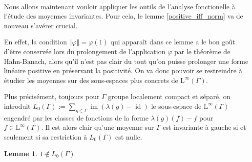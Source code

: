 \documentclass[a4paper,12pt]{article}
\newtheorem{lemma}[theorem]{Lemme}
\newcommand{\norm}[1]{\left\Vert #1\right\Vert}
\newcommand{\ssi}{si et seulement si }
\DeclareMathOperator{\id}{id}
\DeclareMathOperator{\Ima}{im}
\begin{document}
\paragraph{}
Nous allons maintenant vouloir appliquer les outils de l'analyse fonctionelle à l'étude des moyennes invariantes.
Pour cela, le lemme \ref{positive_iff_norm} va de nouveau s'avérer crucial.

En effet, la condition $\norm\varphi = \varphi(1)$ qui apparaît dans ce lemme a le bon goût d'être conservée lors du prolongement de l'application 
$\varphi$ par le théorème de Hahn-Banach, alors qu'il n'est pas clair du tout qu'on puisse prolonger une forme linéaire positive en préservant 
la positivité. On va donc pouvoir se restreindre à étudier les moyennes sur des sous-espaces plus concrets de $\mathrm{L}^\infty(\Gamma)$.

Plus précisément, toujours pour $\Gamma$ groupe localement compact et séparé, on introduit $L_0(\Gamma) := \sum_{g\in\Gamma} \Ima(\lambda(g) - \id)$ le sous-espace de 
$\mathrm{L}^\infty(\Gamma)$ engendré par les classes de fonctions de la forme $\lambda(g)(f) - f$ pour $f\in \mathrm{L}^\infty(\Gamma)$. 
Il est alors clair qu'une moyenne sur $\Gamma$ est invariante à gauche \ssi sa restriction à $L_0(\Gamma)$ est nulle. 

\begin{lemma}
    $1\notin L_0(\Gamma)$
\end{lemma}
\end{document}
